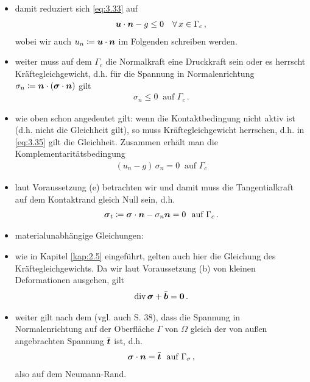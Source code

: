 \begin{itemize}
\item damit reduziert sich \eqref{eq:3.33} auf
\begin{align}\label{eq:3.34}
	\boldsymbol u \cdot \boldsymbol n - g \le 0 \quad \forall \, x \in \Gamma_c \, ,
\end{align}
wobei wir auch $u_n \coloneqq \boldsymbol u \cdot \boldsymbol n$ im Folgenden schreiben werden.

\item weiter muss auf dem  $\Gamma_c$ die Normalkraft eine Druckkraft sein oder es herrscht Kräftegleichgewicht, d.h. für die Spannung in Normalenrichtung $\sigma_n \coloneqq \boldsymbol n\cdot (\boldsymbol \sigma\cdot \boldsymbol n)$ gilt
\begin{align}\label{eq:3.35}
	\sigma_n \le 0  \ \text{ auf }  \Gamma_c \, .
\end{align}

\item wie oben schon angedeutet gilt: wenn die Kontaktbedingung nicht aktiv ist (d.h. nicht die Gleichheit gilt), so muss Kräftegleichgewicht herrschen, d.h. in \eqref{eq:3.35} gilt die Gleichheit. Zusammen erhält man die Komplementaritätsbedingung
\begin{align}\label{eq:3.36}
	(u_n - g )\,   \sigma_n = 0 \ \text{ auf } \Gamma_c
\end{align}

\item laut Voraussetzung (e) betrachten wir  und damit muss die Tangentialkraft auf dem Kontaktrand gleich Null sein, d.h.
\begin{align}\label{eq:3.37}
	\bs \sigma_t \coloneqq \bs \sigma \cdot \bs n - \sigma_n \bs n = 0 \ \text{ auf } \Gamma_c \, .
\end{align}

\item materialunabhängige Gleichungen:

\item wie in Kapitel \ref{kap:2.5} eingeführt, gelten auch hier die Gleichung des Kräftegleichgewichts. Da wir laut Voraussetzung (b) von kleinen Deformationen ausgehen, gilt
\begin{align}\label{eq:3.38}
	\operatorname{div}\boldsymbol \sigma + \bar{\boldsymbol b} = \boldsymbol 0 \, .
\end{align}

\item weiter gilt nach dem \textit{} (vgl. auch \cite{WriggersContact} S. 38), dass die Spannung in Normalenrichtung auf der Oberfläche $\Gamma$ von $\Omega$ gleich der von außen angebrachten Spannung $\bar{\boldsymbol t}$ ist, d.h.
\begin{align}\label{eq:3.39}
	\boldsymbol \sigma \cdot \boldsymbol n = \bar{\boldsymbol t} \ \text{ auf } \Gamma_\sigma \, ,
\end{align}
also auf dem Neumann-Rand.


\end{itemize}
